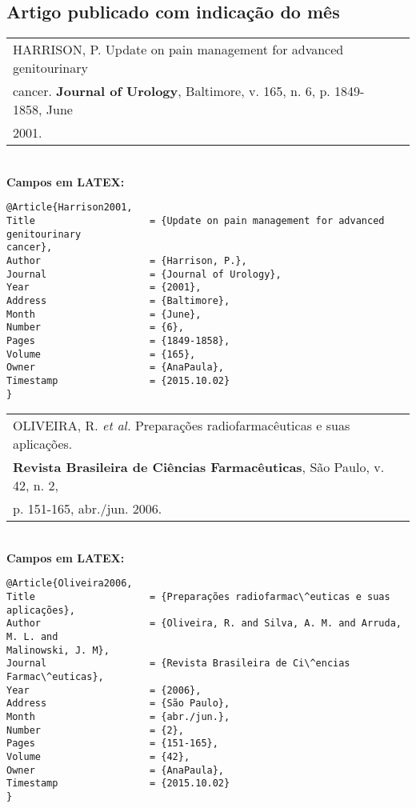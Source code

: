 \subsection{Artigo publicado com indicação do m\^es}

\begin{tabular}{|l|c|} \hline
	HARRISON, P. Update on pain management for advanced genitourinary	\\cancer. \textbf{Journal of Urology}, Baltimore, v. 165, n. 6, p. 1849-1858, June \\2001. 
	\\\hline
\end{tabular} \\

\textbf{Campos em LATEX:} 

\begin{verbatim}
@Article{Harrison2001,
Title                    = {Update on pain management for advanced 
genitourinary 
cancer},
Author                   = {Harrison, P.},
Journal                  = {Journal of Urology},
Year                     = {2001},
Address                  = {Baltimore},
Month                    = {June},
Number                   = {6},
Pages                    = {1849-1858},
Volume                   = {165},
Owner                    = {AnaPaula},
Timestamp                = {2015.10.02}
}
\end{verbatim}

\begin{tabular}{|l|c|} \hline
	OLIVEIRA, R. \textit{et al.} Preparações radiofarmac\^euticas e suas aplicações.\\
	\textbf{Revista Brasileira de Ci\^encias Farmac\^euticas}, São Paulo, v. 42, n. 2,\\
	p. 151-165, abr./jun. 2006. \\\hline
\end{tabular} \\

\textbf{Campos em LATEX:} 

\begin{verbatim}
@Article{Oliveira2006,
Title                    = {Preparações radiofarmac\^euticas e suas 
aplicações},
Author                   = {Oliveira, R. and Silva, A. M. and Arruda, 
M. L. and 
Malinowski, J. M},
Journal                  = {Revista Brasileira de Ci\^encias Farmac\^euticas},
Year                     = {2006},
Address                  = {São Paulo},
Month                    = {abr./jun.},
Number                   = {2},
Pages                    = {151-165},
Volume                   = {42},
Owner                    = {AnaPaula},
Timestamp                = {2015.10.02}
}
\end{verbatim}

